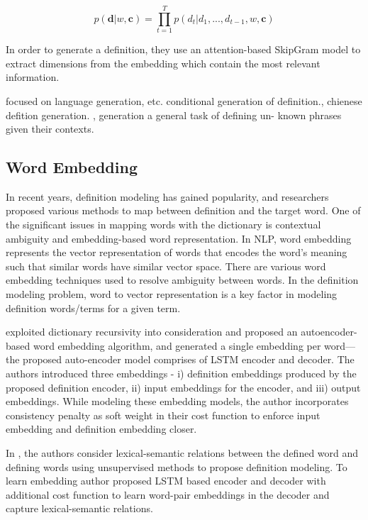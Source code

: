 \begin{equation}
    \label{eq:context_aware_definition_model}
    p(\textbf{d} | w, \textbf{c}) = \prod_{t=1}^{T} p(d_t | d_1,...,d_{t-1}, w, \textbf{c})
\end{equation}

In order to generate a definition, they use an attention-based SkipGram model to
extract dimensions from the embedding which contain the most relevant
information.

\cite{huang_cdm_2021} focused on language generation, etc.\cite{gadetsky_conditional_2018} conditional generation of definition.\cite{zheng_decompose_2021}, chienese defition generation.
\cite{sojka_evaluating_2020}, generation
\cite{li_explicit_2020}
\cite{bevilacqua_generationary_2020}
\cite{zhang_improving_2020}
\cite{yang_incorporating_2020}
\cite{ishiwatari_learning_2019}a general task of defining un-
known phrases given their contexts.

\subsection{Word Embedding}
In recent years, definition modeling has gained popularity, and researchers proposed various methods to map between definition and the target word. One of the significant issues in mapping words with the dictionary is contextual ambiguity and embedding-based word representation. In NLP, word embedding represents the vector representation of words that encodes the word's meaning such that similar words have similar vector space. There are various word embedding techniques used to resolve ambiguity between words. In the definition modeling problem, word to vector representation is a key factor in modeling definition words/terms for a given term. 

\cite{bosc_auto_2018} exploited dictionary recursivity into consideration and proposed an autoencoder-based word embedding algorithm, and generated a single embedding per word—the proposed auto-encoder model comprises of LSTM encoder and decoder. The authors introduced three embeddings - i) definition embeddings produced by the proposed definition encoder, ii) input embeddings for the encoder, and iii) output embeddings. While modeling these embedding models, the author incorporates consistency penalty as soft weight in their cost function to enforce input embedding and definition embedding closer. 

In \cite{washio_bridging_2019}, the authors consider lexical-semantic relations between the defined word and defining words using unsupervised methods to propose definition modeling. To learn embedding author proposed LSTM based encoder and decoder with additional cost function to learn word-pair embeddings in the decoder and capture lexical-semantic relations.

